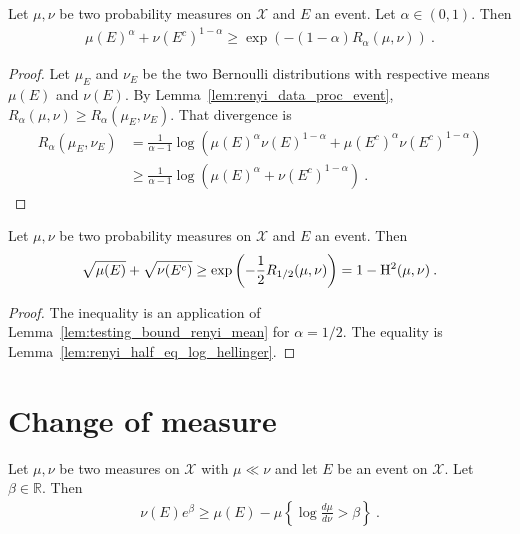 \begin{lemma}
  \label{lem:testing_bound_renyi_mean}
  Let $\mu, \nu$ be two probability measures on $\mathcal X$ and $E$ an event. Let $\alpha \in (0,1)$. Then
  \begin{align*}
  \mu(E)^\alpha + \nu(E^c)^{1 - \alpha}
  \ge \exp\left(-(1 - \alpha) R_{\alpha}(\mu, \nu)\right)
  \: .
  \end{align*}
\end{lemma}

\begin{proof}
Let $\mu_E$ and $\nu_E$ be the two Bernoulli distributions with respective means $\mu(E)$ and $\nu(E)$.
By Lemma~\ref{lem:renyi_data_proc_event}, $R_\alpha(\mu, \nu) \ge R_\alpha(\mu_E, \nu_E)$. That divergence is
\begin{align*}
R_\alpha(\mu_E, \nu_E)
&= \frac{1}{\alpha - 1}\log \left(\mu(E)^\alpha \nu(E)^{1 - \alpha}
  + \mu(E^c)^\alpha \nu(E^c)^{1 - \alpha}\right)
\\
&\ge \frac{1}{\alpha - 1}\log \left(\mu(E)^\alpha + \nu(E^c)^{1 - \alpha}\right)
\: .
\end{align*}
\end{proof}

\begin{corollary}
  \label{cor:testing_bound_hellinger}
  Let $\mu, \nu$ be two probability measures on $\mathcal X$ and $E$ an event. Then
  \begin{align*}
  \sqrt{\mu(E)} + \sqrt{\nu(E^c)}
  \ge \exp\left(-\frac{1}{2} R_{1/2}(\mu, \nu)\right)
  = 1 - \operatorname{H^2}(\mu, \nu)
  \: .
  \end{align*}
\end{corollary}

\begin{proof}
The inequality is an application of Lemma~\ref{lem:testing_bound_renyi_mean} for $\alpha = 1/2$. The equality is Lemma~\ref{lem:renyi_half_eq_log_hellinger}.
\end{proof}

\section{Change of measure}

\begin{lemma}
  \label{lem:llr_change_measure}
  \leanok
  Let $\mu, \nu$ be two measures on $\mathcal X$ with $\mu \ll \nu$ and let $E$ be an event on $\mathcal X$. Let $\beta \in \mathbb{R}$. Then
  \begin{align*}
  \nu(E) e^{\beta} \ge \mu(E) - \mu\left\{ \log\frac{d \mu}{d \nu} > \beta \right\} \: .
  \end{align*}
\end{lemma}

